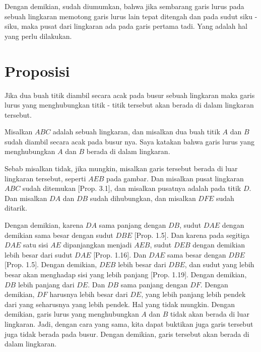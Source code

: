 \documentclass[a4paper]{book}
\begin{document}
Dengan demikian, sudah diumumkan, bahwa jika sembarang garis lurus pada sebuah
lingkaran memotong garis lurus lain tepat ditengah dan pada sudut siku - siku,
maka pusat dari lingkaran ada pada  garis pertama tadi. Yang adalah hal yang
perlu dilakukan.

\section*{\centering Proposisi \thesection}
Jika dua buah titik diambil secara acak pada busur sebuah lingkaran maka garis
lurus yang menghubungkan titik - titik tersebut akan berada di dalam lingkaran
tersebut.
\begin{center}
\end{center} 
Misalkan $ABC$ adalah sebuah lingkaran, dan misalkan dua buah titik $A$ dan $B$
sudah diambil secara acak pada busur nya. Saya katakan bahwa garis lurus yang 
menghubungkan $A$ dan $B$ berada di dalam lingkaran.

Sebab misalkan tidak, jika mungkin, misalkan garis tersebut berada di luar 
lingkaran tersebut, seperti $AEB$ pada gambar. Dan misalkan pusat lingkaran 
$ABC$ sudah ditemukan [Prop. 3.1], dan misalkan pusatnya adalah pada titik $D$.
Dan misalkan $DA$ dan $DB$ sudah dihubungkan, dan misalkan $DFE$ sudah ditarik.

Dengan demikian, karena $DA$ sama panjang dengan $DB$, sudut $DAE$ dengan 
demikian sama besar dengan sudut $DBE$ [Prop. 1.5]. Dan karena pada segitiga
$DAE$ satu sisi $AE$ dipanjangkan menjadi $AEB$, sudut $DEB$ dengan demikian 
lebih besar dari sudut $DAE$ [Prop. 1.16]. Dan $DAE$ sama besar dengan $DBE$ 
[Prop. 1.5]. Dengan demikian, $DEB$ lebih besar dari $DBE$, dan sudut yang
lebih besar akan menghadap sisi yang lebih panjang [Prop. 1.19]. Dengan
demikian, $DB$ lebih panjang dari $DE$. Dan $DB$ sama panjang dengan $DF$. 
Dengan demikian, $DF$ harusnya lebih besar dari $DE$, yang lebih panjang lebih
pendek dari yang seharusnya yang lebih pendek. Hal yang tidak mungkin. Dengan
demikian, garis lurus yang menghubungkan $A$ dan $B$ tidak akan berada di luar
lingkaran. Jadi, dengan cara yang sama, kita dapat buktikan juga garis tersebut
juga tidak berada pada busur. Dengan demikian, garis tersebut akan berada di 
dalam lingkaran.
\end{document}
